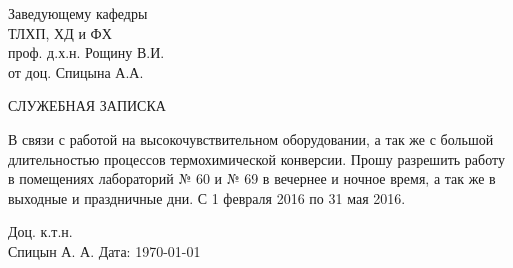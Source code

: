 \documentclass[a4paper,14pt]{extarticle} %
\begin{document}
\thispagestyle{empty}
\hfill
\begin{minipage}{.4\linewidth}
Заведующему  кафедры\\
ТЛХП, ХД и ФХ\\
проф. д.х.н. Рощину В.И.\\
от доц. Спицына А.А.
\end{minipage}

\vfill

\begin{center}
\MakeUppercase{Служебная записка}
\end{center}

В связи с работой на высокочувствительном оборудовании, а так же с большой длительностью процессов  термохимической конверсии.
Прошу разрешить работу в помещениях лабораторий № 60 и № 69 в вечернее и ночное время, а так же в выходные и праздничные дни.
С 1 февраля 2016 по 31 мая 2016.

\vfill
\noindent Доц. к.т.н.\\ Спицын А. А. \hfill Дата: \today  \hfill

\vfill
\end{document}
